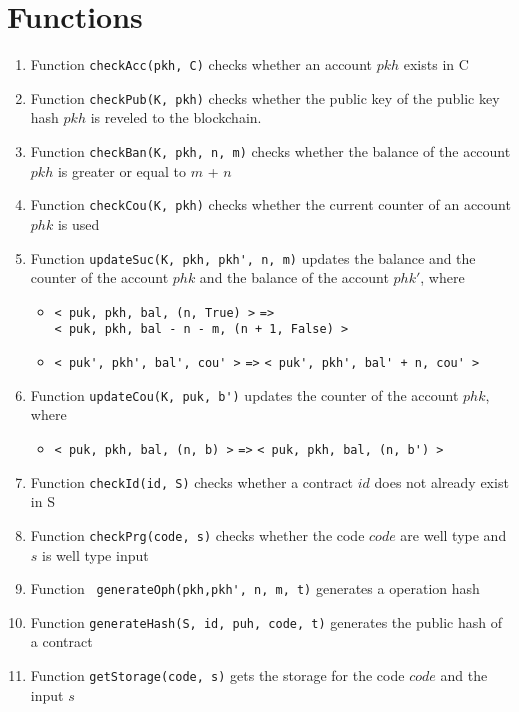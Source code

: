 \documentclass[a4paper]{llncs}
\begin{document}
\section{Functions}
\begin{enumerate}
    \item Function \verb!checkAcc(pkh, C)! checks whether an account $pkh$ exists in C
    \item Function \verb!checkPub(K, pkh)! checks whether the public key of the public key hash $pkh$ is reveled to the blockchain.
    \item Function \verb!checkBan(K, pkh, n, m)! checks whether the balance of the account $pkh$ is greater or equal to $m$ + $n$
    \item Function \verb!checkCou(K, pkh)! checks whether the current counter of an account $phk$ is used
    \item Function \verb!updateSuc(K, pkh, pkh', n, m)! updates the balance and the counter of the account $phk$ and the balance of the account $phk'$, where
    \begin{itemize}
        \item  \verb!< puk, pkh, bal, (n, True) >!  \verb!=>! \\ \verb!< puk, pkh, bal - n - m, (n + 1, False) >!
        \item  \verb!< puk', pkh', bal', cou' >! \verb!=>! \verb!< puk', pkh', bal' + n, cou' >!
    \end{itemize}
    
    \item Function \verb!updateCou(K, puk, b')! updates the counter of the account $phk$, where
    \begin{itemize}
        \item  \verb!< puk, pkh, bal, (n, b) >!  \verb!=>! \verb!< puk, pkh, bal, (n, b') >!
    \end{itemize}
    
    \item Function \verb!checkId(id, S)! checks whether a contract $id$ does not already exist in S
    
    \item Function \verb!checkPrg(code, s)! checks whether the code $code$ are well type and $s$ is well type input 
    
    
    \item Function \verb! generateOph(pkh,pkh', n, m, t)! generates a operation hash

    \item Function \verb!generateHash(S, id, puh, code, t)! generates the public hash of a contract 
     
    \item Function \verb!getStorage(code, s)! gets the storage for the code $code$ and the input $s$
\end{enumerate}
\end{document}
